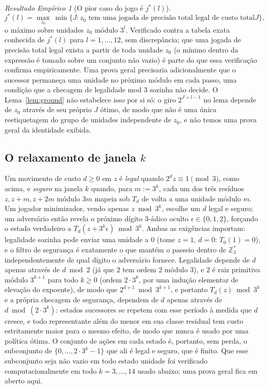 \documentclass[11pt]{amsart}
\theoremstyle{plain}
\theoremstyle{definition}
\theoremstyle{remark}
\newtheorem{empresult}[theorem]{Resultado Emp\'irico}
\newcommand{\Z}{\mathbb{Z}}
\begin{document}
\begin{empresult}[O pior caso do jogo é $j^*(l)$]
\label{er:soundness}
\[
j^*(l) = \max_{z_0}\ \min\{J : \text{$z_0$ tem uma jogada de precisão total legal de custo total
$J$}\},
\]
o máximo sobre unidades $z_0$ módulo $3^l$. Verificado contra a tabela exata conhecida de $j^*(l)$
para $l=1,\dots,12$, sem discrepância; que uma jogada de precisão total legal exista a partir de
toda unidade $z_0$ (o mínimo dentro da expressão é tomado sobre um conjunto não vazio) é parte do
que essa verificação confirma empiricamente. Uma prova geral precisaria adicionalmente que o
sucessor permaneça uma unidade no próximo módulo em cada passo, uma condição que a checagem de
legalidade mod $3$ sozinha não decide. O Lema~\ref{lem:ground} não estabelece isso por si só: o
giro $2^{J+l-1}$ no lema depende de $z_0$ através de seu próprio $J$ ótimo, de modo que não é uma
única reetiquetagem do grupo de unidades independente de $z_0$, e não temos uma prova geral da
identidade exibida.
\end{empresult}

\subsection*{O relaxamento de janela $k$}

Um movimento de custo $d\ge0$ em $z$ é \emph{legal} quando $2^dz\equiv1\pmod3$, como acima, e
\emph{seguro} na janela $k$ quando, para $m:=3^k$, cada um dos três resíduos $z,z+m,z+2m$ módulo
$3m$ mapeia sob $T_d$ de volta a uma unidade módulo $m$. Um jogador minimizador, vendo apenas
$z\bmod3^k$, escolhe um $d$ legal e seguro; um adversário então revela o próximo dígito $3$-ádico
oculto $\epsilon\in\{0,1,2\}$, forçando o estado verdadeiro a $T_d(z+3^k\epsilon)\bmod3^k$. Ambas
as exigências importam: legalidade sozinha pode enviar uma unidade a $0$ (tome $z=1$, $d=0$:
$T_0(1)=0$), e o filtro de segurança é exatamente o que mantém o passeio dentro de $\Z_3^*$
independentemente de qual dígito o adversário fornece. Legalidade depende de $d$ apenas através de
$d\bmod2$ (já que $2$ tem ordem $2$ módulo $3$), e $2$ é raiz primitiva módulo $3^{k+1}$ para todo
$k\ge0$ (ordem $2\cdot3^k$, por uma indução elementar de elevação do expoente), de modo que
$2^{d+1}\bmod3^{k+1}$, e portanto $T_d(z)\bmod3^k$ e a própria checagem de segurança, dependem de
$d$ apenas através de $d\bmod(2\cdot3^k)$: estados sucessores se repetem com esse período à medida
que $d$ cresce, e todo representante além do menor em sua classe residual tem custo estritamente
maior para o mesmo efeito, de modo que nunca é usado por uma política ótima. O conjunto de ações em
cada estado é, portanto, sem perda, o subconjunto de $\{0,\dots,2\cdot3^k-1\}$ que ali é legal e
seguro, que é finito. Que esse subconjunto seja não vazio em todo estado unidade foi verificado
computacionalmente em todo $k=3,\dots,14$ usado abaixo; uma prova geral fica em aberto aqui.
\end{document}
